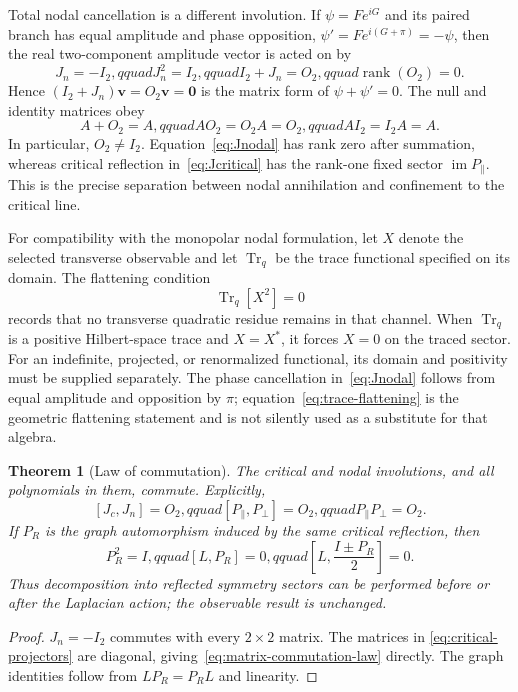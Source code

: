 \documentclass[11pt]{amsart}
\newtheorem{theorem}{Theorem}[section]
\theoremstyle{definition}
\theoremstyle{remark}
\begin{document}
Total nodal cancellation is a different involution.  If
$\psi=F e^{iG}$ and its paired branch has equal amplitude and phase opposition,
$\psi'=F e^{i(G+\pi)}=-\psi$, then the real two-component amplitude vector is acted on by
\begin{equation}\label{eq:Jnodal}
 J_n=-I_2,qquad J_n^2=I_2,qquad I_2+J_n=O_2,qquad
 \operatorname{rank}(O_2)=0.
\end{equation}
Hence $(I_2+J_n)\mathbf v=O_2\mathbf v=\mathbf0$ is the matrix form of
$\psi+\psi'=0$.  The null and identity matrices obey
\begin{equation}\label{eq:null-identity-laws}
 A+O_2=A,qquad AO_2=O_2A=O_2,qquad AI_2=I_2A=A.
\end{equation}
In particular, $O_2\ne I_2$.  Equation~\eqref{eq:Jnodal} has rank zero after summation,
whereas critical reflection in~\eqref{eq:Jcritical} has the rank-one fixed sector
$\operatorname{im}P_{\parallel}$.  This is the precise separation between nodal annihilation
and confinement to the critical line.

For compatibility with the monopolar nodal formulation, let $X$ denote the selected
transverse observable and let $\operatorname{Tr}_q$ be the trace functional specified on its
domain.  The flattening condition
\begin{equation}\label{eq:trace-flattening}
 \operatorname{Tr}_q[X^2]=0
\end{equation}
records that no transverse quadratic residue remains in that channel.  When
$\operatorname{Tr}_q$ is a positive Hilbert-space trace and $X=X^*$, it forces $X=0$ on the
traced sector.  For an indefinite, projected, or renormalized functional, its domain and
positivity must be supplied separately.  The phase cancellation in~\eqref{eq:Jnodal} follows
from equal amplitude and opposition by $\pi$; equation~\eqref{eq:trace-flattening} is the
geometric flattening statement and is not silently used as a substitute for that algebra.

\begin{theorem}[Law of commutation]\label{thm:commutation-law}
The critical and nodal involutions, and all polynomials in them, commute.  Explicitly,
\begin{equation}\label{eq:matrix-commutation-law}
 [J_c,J_n]=O_2,qquad
 [P_{\parallel},P_{\perp}]=O_2,qquad
 P_{\parallel}P_{\perp}=O_2.
\end{equation}
If $P_R$ is the graph automorphism induced by the same critical reflection, then
\begin{equation}\label{eq:full-commutation-law}
 P_R^2=I,qquad [L,P_R]=0,qquad
 \left[L,\frac{I\pm P_R}{2}\right]=0.
\end{equation}
Thus decomposition into reflected symmetry sectors can be performed before or after the
Laplacian action; the observable result is unchanged.
\end{theorem}
\begin{proof}
$J_n=-I_2$ commutes with every $2\times2$ matrix.  The matrices in
\eqref{eq:critical-projectors} are diagonal, giving~\eqref{eq:matrix-commutation-law}
directly.  The graph identities follow from $LP_R=P_RL$ and linearity.
\end{proof}
\end{document}
